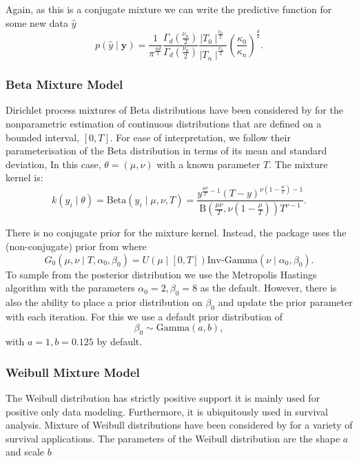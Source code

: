\documentclass[nojss]{jss}
\begin{document}
Again, as this is a conjugate mixture we can write the predictive function for some new data $\hat{y}$
\begin{equation}
p(\hat{y} \mid \mathbf{y}  ) = \frac{1}{\pi ^{\frac{nd}{2}}} \frac{\Gamma _d ( \frac{\nu _n}{2})}{\Gamma _d (\frac{\nu _0}{2})}  \frac{\mid T_0 \mid ^ \frac{\nu _0}{2}}{\mid T_n \mid ^ \frac{\nu _n}{2}} \left(  \frac{\kappa _0}{\kappa _n} \right)  ^\frac{d}{2}.
\end{equation}

\subsubsection{Beta Mixture Model}
Dirichlet process mixtures of Beta distributions have been considered by \cite{kottas_dirichlet_2006} for the nonparametric estimation of continuous distributions that are defined on a bounded interval, $\left[0, T \right]$. For ease of interpretation, we follow their parameterisation of the Beta distribution in terms of its mean and standard deviation, In this case, $\theta = (\mu,\nu)$ with a known parameter $T$. The mixture kernel is:
\begin{equation}
k(y_i \mid \theta) = \text{Beta} (y_i \mid \mu, \nu, T) = \frac{y^{\frac{\mu \nu}{T} - 1} (T-y)^{\nu (1- \frac{\mu}{T})-1}}{\text{B}(\frac{\mu \nu}{T}, \nu(1-\frac{\mu}{T})) T^{\nu -1}}.
\end{equation}

There is no conjugate prior for the mixture kernel. Instead, the  package uses the (non-conjugate) prior from \cite{kottas_dirichlet_2006} where
\begin{equation}
G_0 (\mu , \nu \mid T, \alpha _0 , \beta _0) = U(\mu \mid [0, T]) \text{Inv-Gamma} (\nu \mid \alpha _0, \beta _0).
\end{equation}
To sample from the posterior distribution we use the Metropolis Hastings algorithm with the parameters $\alpha _0 = 2, \beta _0 =8$ as the default. However, there is also the ability to place a prior distribution on $\beta _0$ and update the prior parameter with each iteration. For this we use a default prior distribution of
\begin{equation}
\beta _0 \sim \text{Gamma} (a, b),
\end{equation}
with $a=1, b=0.125$ by default.

\subsubsection{Weibull Mixture Model}
The Weibull distribution has strictly positive support it is mainly used for positive only data modeling. Furthermore, it is ubiquitously used in survival analysis. Mixture of Weibull distributions have been considered by \cite{kottas_dirichlet_2006} for a variety of survival applications.
The parameters of the Weibull distribution are the shape $a$ and scale $b$
\end{document}
